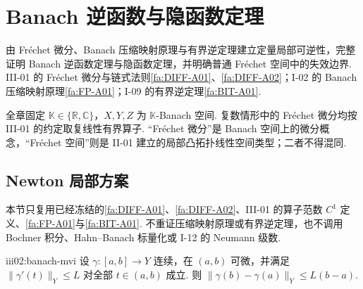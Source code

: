 \chapter{Banach 逆函数与隐函数定理}\label{chap:III-02}
\FAChapterOpening
{由 Fréchet 微分、Banach 压缩映射原理与有界逆定理建立定量局部可逆性，完整证明 Banach 逆函数定理与隐函数定理，并明确普通 Fréchet 空间中的失效边界.}
{III-01 的 Fréchet 微分与链式法则\autoref{fa:DIFF-A01}、\autoref{fa:DIFF-A02}；I-02 的 Banach 压缩映射原理\autoref{fa:FP-A01}；I-09 的有界逆定理\autoref{fa:BIT-A01}.}
{\begin{center}
\end{center}}

全章固定 \(\displaystyle\mathbb K\in\{\mathbb R,\mathbb C\}\)，\(\displaystyle X,Y,Z\) 为 \(\displaystyle\mathbb K\)-Banach 空间. 复数情形中的 Fréchet 微分均按 III-01 的约定取复线性有界算子. “Fréchet 微分”是 Banach 空间上的微分概念，“Fréchet 空间”则是 II-01 建立的局部凸拓扑线性空间类型；二者不得混同.

\section{Newton 局部方案}\label{sec:iii02-newton}

本节只复用已经冻结的\autoref{fa:DIFF-A01}、\autoref{fa:DIFF-A02}、III-01 的算子范数 \(\displaystyle C^1\) 定义、\autoref{fa:FP-A01}与\autoref{fa:BIT-A01}. 不重证压缩映射原理或有界逆定理，也不调用 Bochner 积分、Hahn--Banach 标量化或 I-12 的 Neumann 级数.

\begin{FALemma}{iii02:banach-mvi}
设 \(\displaystyle\gamma:[a,b]\to Y\) 连续，在 \(\displaystyle(a,b)\) 可微，并满足 \(\displaystyle\|\gamma'(t)\|_Y\leqslant L\) 对全部 \(\displaystyle t\in(a,b)\) 成立. 则
\(\displaystyle \|\gamma(b)-\gamma(a)\|_Y \leqslant L(b-a).\)
\end{FALemma}

